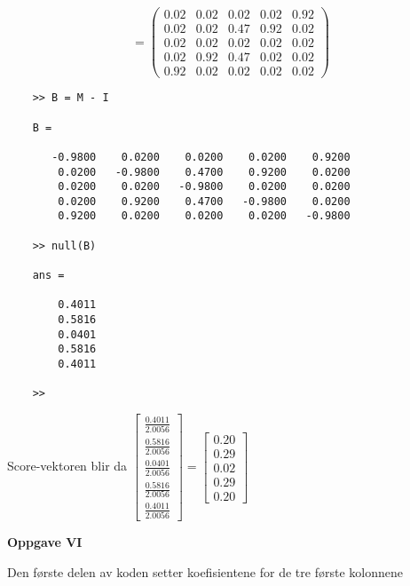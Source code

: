 \documentclass{article}%
\begin{document}
$$=
\begin{pmatrix}
    0.02 &   0.02   &   0.02   &   0.02   &   0.92\\
    0.02 &   0.02   &   0.47   &   0.92   &   0.02\\
    0.02 &   0.02   &   0.02   &   0.02   &   0.02\\
    0.02 &   0.92   &   0.47   &   0.02   &   0.02\\
    0.92 &   0.02   &   0.02   &   0.02   &   0.02
\end{pmatrix}$$
\begin{tcolorbox}[colframe=white]
    \scriptsize
    \begin{verbatim}
    >> B = M - I

    B =

       -0.9800    0.0200    0.0200    0.0200    0.9200
        0.0200   -0.9800    0.4700    0.9200    0.0200
        0.0200    0.0200   -0.9800    0.0200    0.0200
        0.0200    0.9200    0.4700   -0.9800    0.0200
        0.9200    0.0200    0.0200    0.0200   -0.9800
     
    >> null(B)
     
    ans =
     
        0.4011
        0.5816
        0.0401
        0.5816
        0.4011
     
    >> 
\end{verbatim}
\end{tcolorbox}
Score-vektoren blir da 
$
\begin{bmatrix}
    \frac{0.4011}{2.0056} \\[6pt] \frac{0.5816}{2.0056} \\[6pt] \frac{0.0401}{2.0056}\\[6pt]
    \frac{0.5816}{2.0056} \\[6pt] \frac{0.4011}{2.0056}
\end{bmatrix} =
\begin{bmatrix}
    0.20 \\ 0.29 \\ 0.02 \\
    0.29 \\ 0.20
\end{bmatrix}$
\begin{tcolorbox}[colframe=white]
    \textbf{Oppgave VI}
\end{tcolorbox}
Den første delen av koden setter koefisientene for de tre første kolonnene
\end{document}
